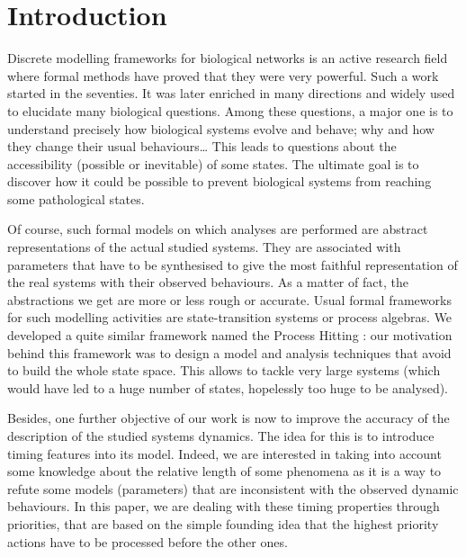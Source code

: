 \section{Introduction}
\label{sec:intro}

Discrete modelling frameworks for biological networks is an active research field where formal methods have proved that they were very powerful.
Such a work started in the seventies.
It was later enriched in many directions and widely used to elucidate many biological questions.
Among these questions, a major one is to understand precisely how biological systems evolve and behave; why and how they change their usual behaviours…
This leads to questions about the accessibility (possible or inevitable) of some states.
The ultimate goal is to discover how it could be possible to prevent biological systems from reaching some pathological states.

Of course, such formal models on which analyses are performed are abstract representations of the actual studied systems.
They are associated with parameters that have to be synthesised %
to give the most faithful representation of the real systems with their observed behaviours.
As a matter of fact, the abstractions we get are more or less rough or accurate.
Usual formal frameworks for such modelling activities are state-transition systems or process algebras. %
We developed a quite similar framework named the Process Hitting \cite{PMR10-TCSB}: %
our motivation behind this framework was to design a model and analysis techniques that avoid to build the whole state space.
This allows to tackle very large systems
(which would have led to a huge number of states, hopelessly too huge to be analysed).

Besides, one further objective of our work is now %
to improve the accuracy of the description of the studied systems dynamics.
The idea for this is to introduce timing features into its model.
Indeed, we are interested in taking into account some knowledge about the relative length of some phenomena as it is a way to refute some models (parameters) that are inconsistent with the observed dynamic behaviours.
In this paper, we are dealing with these timing properties through priorities,
that are based on the simple founding idea that the highest priority actions have to be processed before the other ones.

